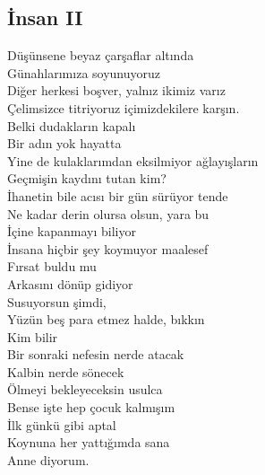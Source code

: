\subsection{İnsan II}

Düşünsene beyaz çarşaflar altında \\
Günahlarımıza soyunuyoruz \\
Diğer herkesi boşver, yalnız ikimiz varız \\
Çelimsizce titriyoruz içimizdekilere karşın. \\
Belki dudakların kapalı \\
Bir adın yok hayatta \\
Yine de kulaklarımdan eksilmiyor ağlayışların \\

\noindent\newline
Geçmişin kaydını tutan kim? \\
İhanetin bile acısı bir gün sürüyor tende \\
Ne kadar derin olursa olsun, yara bu \\
İçine kapanmayı biliyor \\
İnsana hiçbir şey koymuyor maalesef \\
Fırsat buldu mu \\
Arkasını dönüp gidiyor \\

\noindent\newline
Susuyorsun şimdi, \\
Yüzün beş para etmez halde, bıkkın \\
Kim bilir \\
Bir sonraki nefesin nerde atacak \\
Kalbin nerde sönecek \\
Ölmeyi bekleyeceksin usulca \\

\noindent\newline
Bense işte hep çocuk kalmışım \\
İlk günkü gibi aptal \\
Koynuna her yattığımda sana \\
Anne diyorum. \\